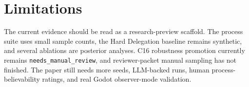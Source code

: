 \section{Limitations}

The current evidence should be read as a research-preview scaffold. The process suite uses small sample counts, the Hard Delegation baseline remains synthetic, and several ablations are posterior analyses. C16 robustness promotion currently remains \texttt{needs\_manual\_review}, and reviewer-packet manual sampling has not finished. The paper still needs more seeds, LLM-backed runs, human process-believability ratings, and real Godot observer-mode validation.
